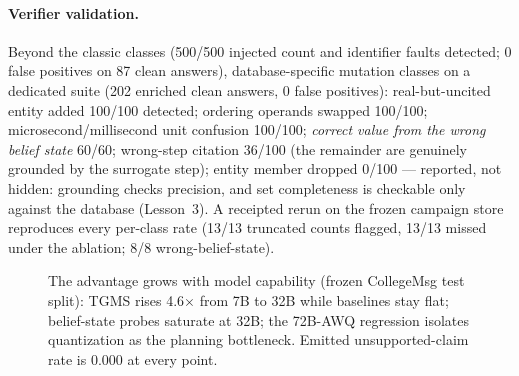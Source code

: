 \documentclass[sigconf]{acmart}
\begin{document}
\paragraph{Verifier validation.}
Beyond the classic classes (500/500 injected count and identifier faults
detected; 0 false positives on 87 clean answers), database-specific
mutation classes on a dedicated suite (202 enriched clean answers, 0
false positives): real-but-uncited entity added 100/100 detected;
ordering operands swapped 100/100; microsecond/millisecond unit
confusion 100/100; \emph{correct value from the wrong belief state}
60/60; wrong-step citation 36/100 (the remainder are genuinely grounded
by the surrogate step); entity member dropped 0/100 --- reported, not
hidden: grounding checks precision, and set completeness is checkable
only against the database (Lesson~3). A receipted rerun on the frozen
campaign store reproduces every per-class rate (13/13 truncated counts
flagged, 13/13 missed under the ablation; 8/8 wrong-belief-state).

\begin{figure}[t]
\centering
{}
\caption{The advantage grows with model capability (frozen CollegeMsg
test split): TGMS rises 4.6$\times$ from 7B to 32B while baselines stay
flat; belief-state probes saturate at 32B; the 72B-AWQ regression
isolates quantization as the planning bottleneck. Emitted
unsupported-claim rate is 0.000 at every point.}
\label{fig:scale}
\end{figure}
\end{document}
